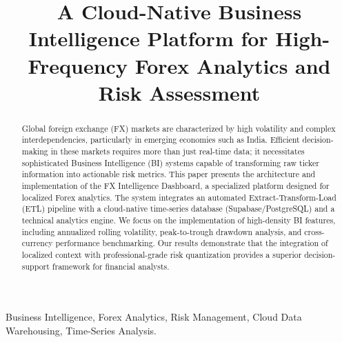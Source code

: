 \documentclass[conference]{IEEEtran}
\begin{document}
\title{A Cloud-Native Business Intelligence Platform for High-Frequency Forex Analytics and Risk Assessment\\
}

\author{
\and
{}
}

\maketitle

\begin{abstract}
Global foreign exchange (FX) markets are characterized by high volatility and complex interdependencies, particularly in emerging economies such as India. Efficient decision-making in these markets requires more than just real-time data; it necessitates sophisticated Business Intelligence (BI) systems capable of transforming raw ticker information into actionable risk metrics. This paper presents the architecture and implementation of the FX Intelligence Dashboard, a specialized platform designed for localized Forex analytics. The system integrates an automated Extract-Transform-Load (ETL) pipeline with a cloud-native time-series database (Supabase/PostgreSQL) and a technical analytics engine. We focus on the implementation of high-density BI features, including annualized rolling volatility, peak-to-trough drawdown analysis, and cross-currency performance benchmarking. Our results demonstrate that the integration of localized context with professional-grade risk quantization provides a superior decision-support framework for financial analysts.
\end{abstract}

\begin{IEEEkeywords}
Business Intelligence, Forex Analytics, Risk Management, Cloud Data Warehousing, Time-Series Analysis.
\end{IEEEkeywords}
\end{document}
